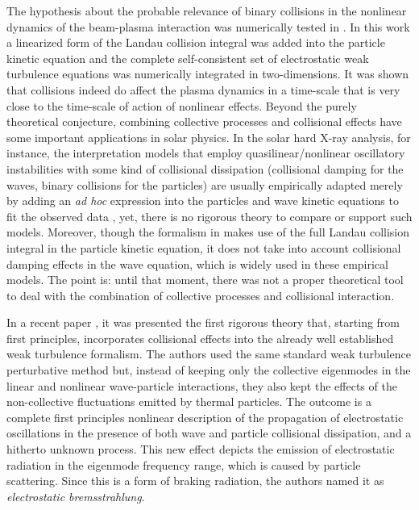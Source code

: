 \documentclass[12pt,a4paper,ruledheader]{report}
\begin{document}
The hypothesis about the probable relevance of binary
collisions in the nonlinear dynamics of the beam-plasma
interaction was numerically tested in \cite{Tigik2016a}.
In this work a linearized form of the Landau collision
integral was added into the particle kinetic equation
and the complete self-consistent set of electrostatic
weak turbulence equations was numerically integrated in
two-dimensions. It was shown that collisions indeed do
affect the plasma dynamics in a time-scale that is very
close to the time-scale of action of nonlinear effects.
Beyond the purely theoretical conjecture, combining
collective processes and collisional effects have some
important applications in solar physics. In the solar
hard X-ray analysis, for instance, the interpretation
models that employ quasilinear/nonlinear oscillatory
instabilities with some kind of collisional dissipation
(collisional damping for the waves, binary collisions for
the particles) are usually empirically adapted merely by
adding an \emph{ad hoc} expression into the particles and wave
kinetic equations to fit the observed data \cite{PK95,
  Kohl1998,Veronig05,Brown2006,Kontar2011,KKDSSK11}, yet,
there is no rigorous theory to compare or support such
models. Moreover, though the formalism in \cite{Tigik2016a}
makes use of the full Landau collision integral in the
particle kinetic equation, it does not take into account
collisional damping effects in the wave equation, which is
widely used in these empirical models. The point is: until
that moment, there was not a proper theoretical tool to deal
with the combination of collective processes and collisional
interaction.

In a recent paper \cite{YZKS16}, it was presented the first rigorous
theory that, starting from first principles, incorporates collisional
effects into the already well established weak turbulence formalism.
The authors used the same standard weak turbulence perturbative method
but, instead of keeping only the collective eigenmodes in the linear
and nonlinear wave-particle interactions, they also kept the effects
of the non-collective fluctuations emitted by thermal particles. The
outcome is a complete first principles nonlinear description of the
propagation of electrostatic oscillations in the presence of both wave
and particle collisional dissipation, and a hitherto unknown process.
This new effect depicts the emission of electrostatic radiation in the
eigenmode frequency range, which is caused by particle scattering. 
Since this is a form of braking radiation, the authors named it as
\emph{electrostatic bremsstrahlung}.
\end{document}
